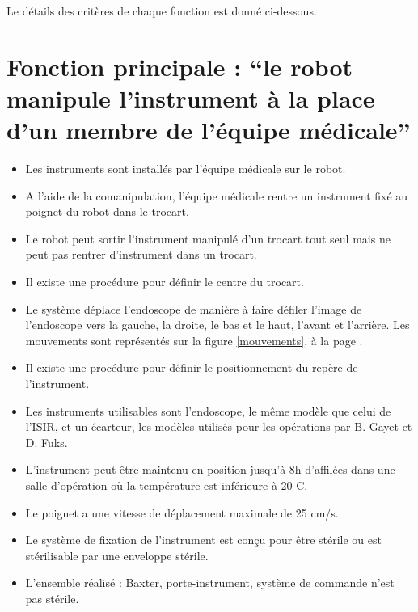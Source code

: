 \documentclass[oneside, DIV=11]{scrreprt}
\begin{document}
Le détails des critères de chaque fonction est donné ci-dessous.


\section{Fonction principale : “le robot manipule l'instrument à la place d'un membre de l'équipe médicale”}

\begin{itemize}
    \item Les instruments sont installés par l'équipe médicale sur le robot.
    \item A l'aide de la comanipulation, l'équipe médicale rentre un instrument fixé au poignet du robot dans le trocart. 
    \item Le robot peut sortir l'instrument manipulé d'un trocart tout seul mais ne peut pas rentrer d'instrument dans un trocart.
     \item Il existe une procédure pour définir le centre du trocart.
    \item Le système déplace l’endoscope de manière à faire défiler l’image de l’endoscope vers la gauche, la droite, le bas et le haut, l'avant et l'arrière. Les mouvements sont représentés sur la figure \ref{mouvements}, à la page \pageref{mouvements}.
    \item Il existe une procédure pour définir le positionnement du repère de l'instrument.
    \item Les instruments utilisables sont l'endoscope, le même modèle que celui de l'ISIR, et un écarteur, les modèles utilisés pour les opérations par B. Gayet et D. Fuks. \item L'instrument peut être maintenu en position jusqu'à 8h d'affilées dans une salle d'opération où la température est inférieure à 20 \degree C.
    \item Le poignet a une vitesse de déplacement maximale de 25 cm/s.
    \item Le système de fixation de l'instrument est conçu pour être stérile ou est stérilisable par une enveloppe stérile.
    \item L'ensemble réalisé : Baxter, porte-instrument, système de commande n’est pas stérile.
\end{itemize}
\end{document}
